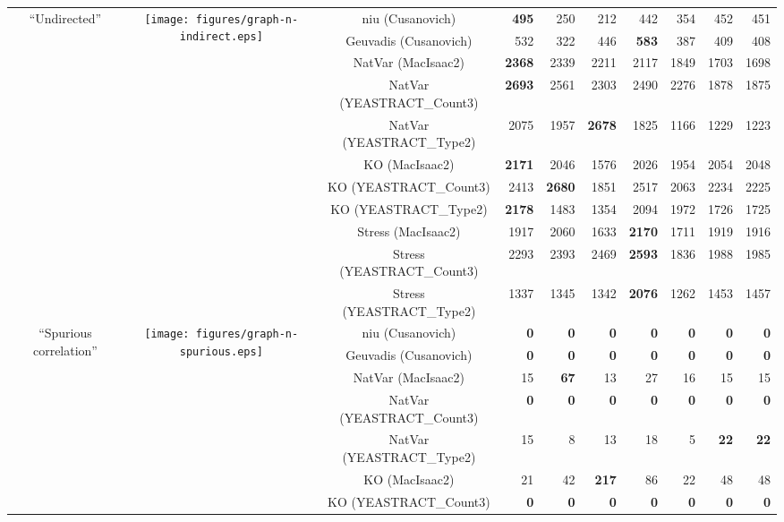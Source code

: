 \begin{table*}[t]
\begin{adjustbox}{max width=\textwidth}
\begin{tabular}{cccrrrrrrr}
\multirow{11}{*}{``Undirected''} & \multirow{11}{*}{\texttt{[image: figures/graph-n-indirect.eps]}} & niu (Cusanovich) & \textbf{495} & 250 & 212 & 442 & 354 & 452 & 451 \\
  &   & Geuvadis (Cusanovich) & 532 & 322 & 446 & \textbf{583} & 387 & 409 & 408 \\
  &   & NatVar (MacIsaac2) & \textbf{2368} & 2339 & 2211 & 2117 & 1849 & 1703 & 1698 \\
  &   & NatVar (YEASTRACT\_Count3) & \textbf{2693} & 2561 & 2303 & 2490 & 2276 & 1878 & 1875 \\
  &   & NatVar (YEASTRACT\_Type2) & 2075 & 1957 & \textbf{2678} & 1825 & 1166 & 1229 & 1223 \\
  &   & KO (MacIsaac2) & \textbf{2171} & 2046 & 1576 & 2026 & 1954 & 2054 & 2048 \\
  &   & KO (YEASTRACT\_Count3) & 2413 & \textbf{2680} & 1851 & 2517 & 2063 & 2234 & 2225 \\
  &   & KO (YEASTRACT\_Type2) & \textbf{2178} & 1483 & 1354 & 2094 & 1972 & 1726 & 1725 \\
  &   & Stress (MacIsaac2) & 1917 & 2060 & 1633 & \textbf{2170} & 1711 & 1919 & 1916 \\
  &   & Stress (YEASTRACT\_Count3) & 2293 & 2393 & 2469 & \textbf{2593} & 1836 & 1988 & 1985 \\
  &   & Stress (YEASTRACT\_Type2) & 1337 & 1345 & 1342 & \textbf{2076} & 1262 & 1453 & 1457 \\
\midrule
\multirow{11}{*}{``Spurious correlation''} & \multirow{11}{*}{\texttt{[image: figures/graph-n-spurious.eps]}} & niu (Cusanovich) & \textbf{0} & \textbf{0} & \textbf{0} & \textbf{0} & \textbf{0} & \textbf{0} & \textbf{0} \\
  &   & Geuvadis (Cusanovich) & \textbf{0} & \textbf{0} & \textbf{0} & \textbf{0} & \textbf{0} & \textbf{0} & \textbf{0} \\
  &   & NatVar (MacIsaac2) & 15 & \textbf{67} & 13 & 27 & 16 & 15 & 15 \\
  &   & NatVar (YEASTRACT\_Count3) & \textbf{0} & \textbf{0} & \textbf{0} & \textbf{0} & \textbf{0} & \textbf{0} & \textbf{0} \\
  &   & NatVar (YEASTRACT\_Type2) & 15 & 8 & 13 & 18 & 5 & \textbf{22} & \textbf{22} \\
  &   & KO (MacIsaac2) & 21 & 42 & \textbf{217} & 86 & 22 & 48 & 48 \\
  &   & KO (YEASTRACT\_Count3) & \textbf{0} & \textbf{0} & \textbf{0} & \textbf{0} & \textbf{0} & \textbf{0} & \textbf{0} \\

\end{tabular}
\end{adjustbox}
\end{table*}
